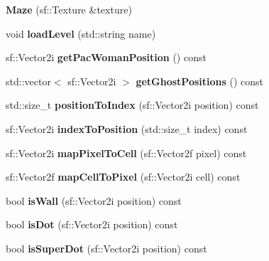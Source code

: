 \begin{DoxyCompactItemize}
\item 
\mbox{\label{classMaze_a4f49b2e5002abda74794f50c683b4954}} 
{\bfseries Maze} (sf\+::\+Texture \&texture)
\item 
\mbox{\label{classMaze_adef4f366c652cfd5a92f4244dc47b8fd}} 
void {\bfseries load\+Level} (std\+::string name)
\item 
\mbox{\label{classMaze_af8d512ec2e2d85258688743eb98f3426}} 
sf\+::\+Vector2i {\bfseries get\+Pac\+Woman\+Position} () const
\item 
\mbox{\label{classMaze_a9605a231bfb215104fa7d47fa31f1584}} 
std\+::vector$<$ sf\+::\+Vector2i $>$ {\bfseries get\+Ghost\+Positions} () const
\item 
\mbox{\label{classMaze_aad26af9cc25f7e5c48f93e111fee7fc5}} 
std\+::size\+\_\+t {\bfseries position\+To\+Index} (sf\+::\+Vector2i position) const
\item 
\mbox{\label{classMaze_aecb5fd1f2237d2619e5191c64a8a817c}} 
sf\+::\+Vector2i {\bfseries index\+To\+Position} (std\+::size\+\_\+t index) const
\item 
\mbox{\label{classMaze_a11674bedf3a85cba24094aaadca0a4a6}} 
sf\+::\+Vector2i {\bfseries map\+Pixel\+To\+Cell} (sf\+::\+Vector2f pixel) const
\item 
\mbox{\label{classMaze_aba18169c52d89adf74d900d80dd5420e}} 
sf\+::\+Vector2f {\bfseries map\+Cell\+To\+Pixel} (sf\+::\+Vector2i cell) const
\item 
\mbox{\label{classMaze_afd8161771721c755ab9f741c2b39b24f}} 
bool {\bfseries is\+Wall} (sf\+::\+Vector2i position) const
\item 
\mbox{\label{classMaze_a89c9115911869cc90e2276e8c76384f2}} 
bool {\bfseries is\+Dot} (sf\+::\+Vector2i position) const
\item 
\mbox{\label{classMaze_a19c5bf92a89045c6ef8430ab58a5d9cc}} 
bool {\bfseries is\+Super\+Dot} (sf\+::\+Vector2i position) const

\end{DoxyCompactItemize}
